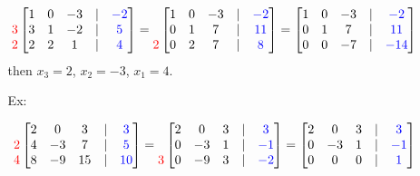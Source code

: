 \documentclass[reqno]{amsart}
\theoremstyle{definition}
\begin{document}
\begin{itemize}
\begin{enumerate}
\begin{equation*}
\begin{matrix}
\\
{\color{red}3}\\
{\color{red}2}
\end{matrix}
\begin{bmatrix}
1 & 0 & -3 & | & {\color{blue}-2}\\
3 & 1 & -2 & | & {\color{blue}5}\\
2 & 2 & 1 & | & {\color{blue}4}
\end{bmatrix} = \begin{matrix}
\\
\\
{\color{red}2}
\end{matrix}\begin{bmatrix}
1 & 0 & -3 & | & {\color{blue}-2}\\
0 & 1 & 7 & | & {\color{blue}11}\\
0 & 2 & 7 & | & {\color{blue}8}
\end{bmatrix} = \begin{bmatrix}
1 & 0 & -3 & | & {\color{blue}-2}\\
0 & 1 & 7 & | & {\color{blue}11}\\
0 & 0 & -7 & | & {\color{blue}-14}
\end{bmatrix}
\end{equation*}
%
then $x_3 = 2$, $x_2 = -3$, $x_1 = 4$.

\item[Ex:   ]  

\begin{equation*}
\begin{matrix}
\\
{\color{red}2}\\
{\color{red}4}
\end{matrix}
\begin{bmatrix}
2 & 0 & 3 & | & {\color{blue}3}\\
4 & -3 & 7 & | & {\color{blue}5}\\
8 & -9 & 15 & | & {\color{blue}10}
\end{bmatrix} = \begin{matrix}
\\
\\
{\color{red}3}
\end{matrix}\begin{bmatrix}
2 & 0 & 3 & | & {\color{blue}3}\\
0 & -3 & 1 & | &  {\color{blue}-1}\\
0 & -9 & 3 & | &  {\color{blue}-2}
\end{bmatrix} = \begin{bmatrix}
2 & 0 & 3 & | & {\color{blue}3}\\
0 & -3 & 1 & | &  {\color{blue}-1}\\
0 & 0 & 0 & | & {\color{blue}1}
\end{bmatrix}
\end{equation*}


\end{enumerate}
\end{itemize}
\end{document}
